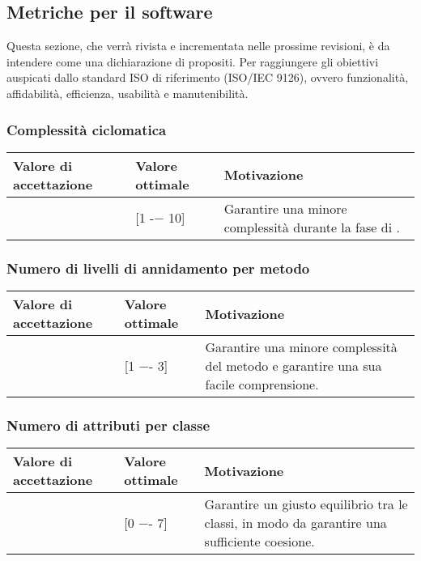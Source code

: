 \subsection{Metriche per il software}
Questa sezione, che verrà rivista e incrementata nelle prossime revisioni, è da intendere come una dichiarazione di propositi.
Per raggiungere gli obiettivi auspicati dallo standard ISO di riferimento (ISO/IEC 9126), ovvero funzionalità, affidabilità,
efficienza, usabilità e manutenibilità.


\subsubsection{Complessità ciclomatica}

\begin{center}
		\begin{tabular}{|P{2.5cm}|P{2.5cm}|P{6cm}|}
		\hline
			\textbf{Valore di accettazione}	& \textbf{Valore ottimale} & \textbf{Motivazione} \\
			\hline
			[1 -− 15] & [1 -− 10] &	Garantire una minore complessità durante la fase di \COD. \\
			\hline
			\end{tabular}
\end{center}

\subsubsection{Numero di livelli di annidamento per metodo}

\begin{center}
		\begin{tabular}{|P{2.5cm}|P{2.5cm}|P{6cm}|}
		\hline
			\textbf{Valore di accettazione}	& \textbf{Valore ottimale} & \textbf{Motivazione} \\
			\hline
			[1 -- 5] & [1 −- 3] &	Garantire una minore complessità del metodo e garantire una sua facile comprensione. \\
			\hline
			\end{tabular}
\end{center}

\subsubsection{Numero di attributi per classe}

\begin{center}
		\begin{tabular}{|P{2.5cm}|P{2.5cm}|P{6cm}|}
		\hline
			\textbf{Valore di accettazione}	& \textbf{Valore ottimale} & \textbf{Motivazione} \\
			\hline
			[0 −- 11] & [0 −- 7] &	Garantire un giusto equilibrio tra le classi, in modo da garantire una sufficiente coesione. \\
			\hline
			\end{tabular}
\end{center}

